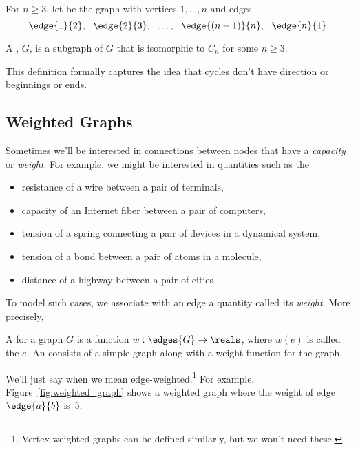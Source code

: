 \begin{definition}
  For $n \ge 3$, let  be the graph with vertices $1,\dots, n$
  and edges
\[
\edge{1}{2},\ \ \edge{2}{3},\ \ \dots,\ \ \edge{(n-1)}{n},\ \ \edge{n}{1}.
\]

\iffalse
A graph is a \term{cycle} of length $n$ iff it is isomorphic to $C_n$
for some $n \ge 3$.
\fi

A , $G$, is a subgraph of $G$ that is
isomorphic to $C_n$ for some $n \ge 3$.
\end{definition}

This definition formally captures the idea that cycles don't
have direction or beginnings or ends.

\iffalse

\begin{editingnotes}
\section{Weighted Graphs}

Sometimes we'll be interested in connections between nodes that have a
\emph{capacity} or \emph{weight}.  For example, we might be interested in
quantities such as the
\begin{itemize}

\item resistance of a wire between a pair of terminals, 

\item capacity of an Internet fiber between a pair of computers,

\item tension of a spring connecting a pair of devices in a dynamical system,

\item tension of a bond between a pair of atoms in a molecule,

\item distance of a highway between a pair of cities.

\end{itemize}
To model such cases, we associate with an edge a quantity called its
\emph{weight}.  More precisely,
\begin{definition}
  A  for a graph $G$ is a function $w: \edges{G} \to
  \reals$, where $w(e)$ is called the  $e$.
An  consists of a simple graph along with
a weight function for the graph.
\end{definition}
We'll just say  when we mean
edge-weighted.\footnote{Vertex-weighted graphs can be defined similarly,
  but we won't need these.}
For example, Figure~\ref{fig:weighted_graph} shows a weighted graph
where the weight of edge $\edge{a}{b}$ is~5.


\end{editingnotes}
